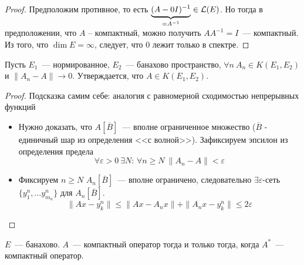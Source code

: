 \begin{proof}
    Предположим противное, то есть $\underbrace{(A - 0 I)^{-1}}_{=A^{-1}} \in \mathcal{L}(E)$. Но тогда в предположении, что 
$A$ -- компактный, можно получить $AA^{-1} = I$~--- компактный. Из того, что $\dim E = \infty$, следует, что $0$ лежит только в спектре.
\end{proof}

\begin{theorem}[12.1]\label{12.1}
    Пусть $E_1$~--- нормированное, $E_2$~--- банахово пространство, $\forall n \: A_n \in K(E_1, E_2)$ и $\|A_n - A\| \to 0$. Утверждается, что $A \in K(E_1, E_2)$.
\end{theorem}


\begin{proof}
    Подсказка самим себе: аналогия с равномерной сходимостью непрерывных функций

\begin{itemize}
    \item[1.] Нужно доказать, что $A[\overline{B}]$~--- вполне ограниченное множество ($\overline{B}$ - единичный шар из определения <<с волной>>). Зафиксируем эпсилон из определения предела
    \[ \forall \varepsilon > 0 \: \exists N\!: \, \forall n \geqslant N \: \|A_n-A\| < \varepsilon\]
    \item[2.] Фиксируем $n \geqslant N$
    $A_n[\overline{B}]$~--- вполне ограничено, следовательно
    $\exists \varepsilon$-сеть $\{y_1^n, \ldots y_{m_n}^n\}$ для $A_n[\overline{B}]$.
    \[
    \|A x - y_k^n\| \leqslant \|A x - A_n x\| + \|A_n x - y_k^n\| \leqslant 2 \varepsilon
    \]
\end{itemize}
\end{proof}

\begin{unnecessary}
    \begin{theorem}[Шаудера]
    $E$~--- банахово. $A$~--- компактный оператор тогда и только тогда, когда $A^*$~--- компактный оператор.
    \end{theorem}
    
\end{unnecessary}
